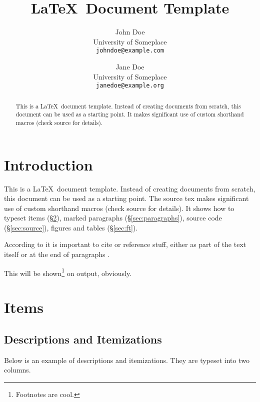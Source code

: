 \documentclass[12pt,a4paper]{article}
\title{\LaTeX\ Document Template}
\author{
	John Doe \\
	{\small University of Someplace} \\
	\texttt{\footnotesize johndoe@example.com} \\
\and
	Jane Doe \\
	{\small University of Someplace} \\
	\texttt{\footnotesize janedoe@example.org} \\
}
\begin{document}
\maketitle

\begin{abstract}
This is a \LaTeX\ document template.  Instead of creating documents from
scratch, this document can be used as a starting point.  It makes significant
use of custom shorthand macros (check source for details).
\end{abstract}

\tableofcontents
\pagebreak


\section{Introduction}

This is a \LaTeX\ document template.  Instead of creating documents from
scratch, this document can be used as a starting point.  The source tex makes
significant use of custom shorthand macros (check source for details).  It
shows how to typeset items (\S\ref{sec:items}), marked paragraphs
(\S\ref{sec:paragraphs}), source code (\S\ref{sec:source}), figures and tables
(\S\ref{sec:ft}).

According to \citet{proposing-proposals} it is important to cite or reference
stuff, either as part of the text itself or at the end of paragraphs
\citep{something,proposing-proposals}.

This will be shown\footnote{Footnotes are cool.} on output, obviously\footlong.


\section{Items}
\label{sec:items}

\subsection{Descriptions and Itemizations}

Below is an example of descriptions and itemizations.  They are typeset into
two columns. 
\end{document}
